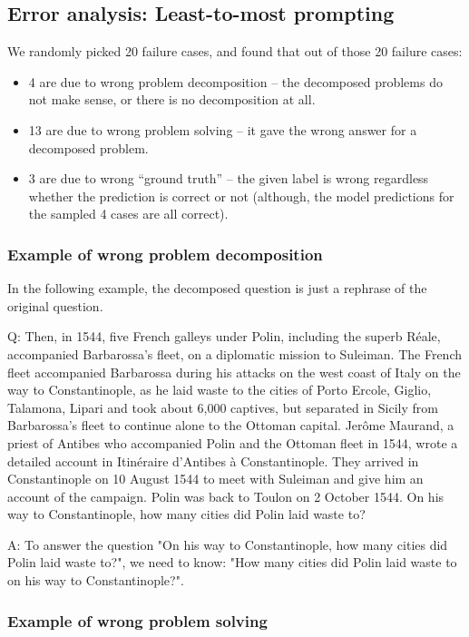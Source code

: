 \subsection{Error analysis: Least-to-most prompting}
\label{app:drop-error-analysis}

We randomly picked 20 failure cases, and found that out of those 20 failure cases:
\begin{itemize}
    \item 4 are due to wrong problem decomposition -- the decomposed problems do not make sense, or there is no decomposition at all.
    \item 13 are due to wrong problem solving -- it gave the wrong answer for a decomposed problem.
    \item 3 are due to wrong ``ground truth'' -- the given label is wrong regardless whether the prediction is correct or not (although, the model predictions for the sampled 4 cases are all correct).
\end{itemize}

\subsubsection{Example of wrong problem decomposition}

In the following example, the decomposed question is just a rephrase of the original question.

Q: Then, in 1544, five French galleys under Polin, including the superb Réale, accompanied Barbarossa's fleet, on a diplomatic mission to Suleiman. The French fleet accompanied Barbarossa during his attacks on the west coast of Italy on the way to Constantinople, as he laid waste to the cities of Porto Ercole, Giglio, Talamona, Lipari and took about 6,000 captives, but separated in Sicily from Barbarossa's fleet to continue alone to the Ottoman capital. Jerôme Maurand, a priest of Antibes who accompanied Polin and the Ottoman fleet in 1544, wrote a detailed account in Itinéraire d'Antibes à Constantinople. They arrived in Constantinople on 10 August 1544 to meet with Suleiman and give him an account of the campaign. Polin was back to Toulon on 2 October 1544. On his way to Constantinople, how many cities did Polin laid waste to?

A: To answer the question "On his way to Constantinople, how many cities did Polin laid waste to?", we need to know: "How many cities did Polin laid waste to on his way to Constantinople?".

\subsubsection{Example of wrong problem solving}

